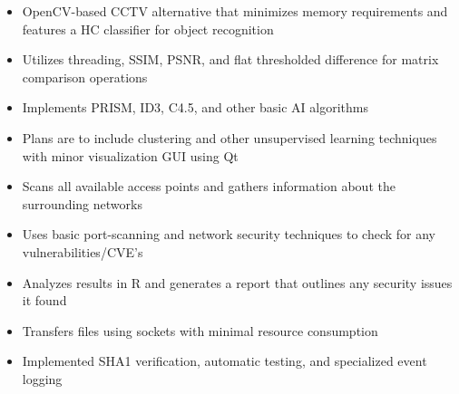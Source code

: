 \documentclass[10pt,a4paper,ragged2e,withhyper,academicons]{altacv}
\begin{document}
\tagline{}


\makecvheader



\begin{paracol}{2}


\begin{itemize}
\item OpenCV-based CCTV alternative that minimizes memory requirements and features a HC classifier for object recognition
\item Utilizes threading, SSIM, PSNR, and flat thresholded difference for matrix comparison operations
\end{itemize}

\divider

\begin{itemize}
\item Implements PRISM, ID3, C4.5, and other basic AI algorithms
\item Plans are to include clustering and other unsupervised learning techniques with minor visualization GUI using Qt
\end{itemize}

\divider

\begin{itemize}
\item Scans all available access points and gathers information about the surrounding networks
\item Uses basic port-scanning and network security techniques to check for any vulnerabilities/CVE's
\item Analyzes results in R and generates a report that outlines any security issues it found
\end{itemize}

\divider

\begin{itemize}
\item Transfers files using sockets with minimal resource consumption
\item Implemented SHA1 verification, automatic testing, and specialized event logging
\end{itemize}


\end{paracol}
\end{document}
